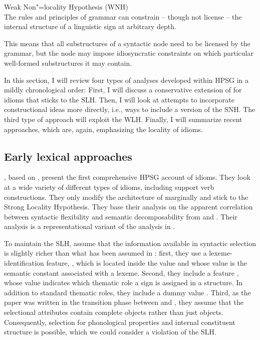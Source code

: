 \documentclass[output=paper
 	        ,biblatex
                ,babelshorthands
                ,newtxmath
                ,draftmode
                ,colorlinks, citecolor=brown
]{langscibook}
\begin{document}
\eanoraggedright
Weak Non"=locality Hypothesis (WNH)\label{wnh}\\
The rules and principles of grammar can constrain -- though not license -- the internal structure of a linguistic sign at arbitrary depth.
\z 

This means that all substructures of a syntactic node need to be licensed by the grammar, but the node may impose idiosyncratic constraints on which particular well-formed substructures it may contain.


In this section, I will review four types of analyses developed within HPSG in a mildly chronological order:
First, I will discuss a conservative extension of \citet{ps2} for idioms \citep{KE94a} that sticks to the SLH. 
Then, I will look at attempts to incorporate constructional ideas more directly, i.e., ways to include a version of the SNH. 
The third type of approach will exploit the WLH. Finally, I will summarize recent approaches, which are, again, emphasizing the locality of idioms.

\subsection{Early lexical approaches}
\label{Sec-EarlyLexical}

\citet{KE94a}, based on \citet{Erbach92a}, present the first comprehensive HPSG account of idioms.
They look at a wide variety of different types of  idioms, including support verb
constructions.  They only modify the architecture of \citet{ps2} marginally and stick to the Strong
Locality Hypothesis.  They base their analysis on the apparent correlation between syntactic
flexibility and semantic decomposability from \citet{WSN84a-u} and \citet{NSW94a}.  Their analysis
is a representational variant of the analysis in \citet{GKPS85a}.

To maintain the SLH, \citet{KE94a} assume that the information available in syntactic selection is
slightly richer than what has been assumed in \citet{ps2}: first, they use a lexeme-identification
feature, , which is located inside the  value and whose value is the
semantic constant associated with a lexeme.  Second, they include a feature , whose
value indicates which thematic role a sign is assigned in a structure. In addition to standard
thematic roles, they include a dummy value .  Third, as the paper was written in the
transition phase between \citet{ps} and \citet{ps2}, they assume that the selectional attributes
contain complete  objects rather than just  objects.  Consequently,
selection for phonological properties and internal constituent structure is possible, which we could
consider a violation of the SLH.
\end{document}

